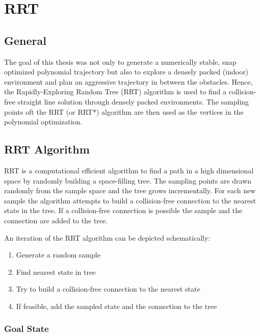 \chapter{RRT}\label{chap:RRT}

\section{General}

The goal of this thesis was not only to generate a numerically stable, snap optimized polynomial trajectory but also to explore a densely packed (indoor) environment and plan an aggressive trajectory in between the obstacles. Hence, the Rapidly-Exploring Random Tree (RRT) algorithm is used to find a collision-free straight line solution through densely packed environments. The sampling points oft the RRT (or RRT*) algorithm are then used as the vertices in the polynomial optimization.


\section{RRT Algorithm}\label{sec:RRT}

RRT is a computational efficient algorithm to find a path in a high dimensional space by randomly building a space-filling tree. The sampling points are drawn randomly from the sample space and the tree grows incrementally. 
For each new sample the algorithm attempts to build a collision-free connection to the nearest state in the tree. If a collision-free connection is possible the sample and the connection are added to the tree. \newline

An iteration of the RRT algorithm can be depicted schematically:


\begin{enumerate}
  \item Generate a random sample
  \item Find nearest state in tree
  \item Try to build a collision-free connection to the nearest state
  \item If feasible, add the sampled state and the connection to the tree
\end{enumerate}

\subsection{Goal State}

